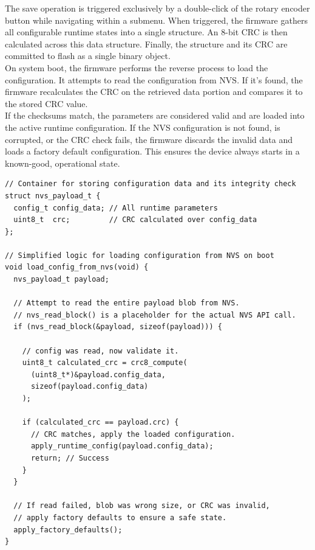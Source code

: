 The save operation is triggered exclusively by a double-click of the rotary encoder button while navigating within a submenu.
When triggered, the firmware gathers all configurable runtime states into a single structure.
An 8-bit \ac{CRC} is then calculated across this data structure.
Finally, the structure and its \ac{CRC} are committed to flash as a single binary object. \\

On system boot, the firmware performs the reverse process to load the configuration.
It attempts to read the configuration from \ac{NVS}.
If it's found, the firmware recalculates the \ac{CRC} on the retrieved data portion and compares it to the stored \ac{CRC} value. \\

If the checksums match, the parameters are considered valid and are loaded into the active runtime configuration.
If the \ac{NVS} configuration is not found, is corrupted, or the \ac{CRC} check fails, the firmware discards the invalid data and loads a factory default configuration.
This ensures the device always starts in a known-good, operational state.

\begin{longlisting}
\begin{verbatim}
// Container for storing configuration data and its integrity check
struct nvs_payload_t {
  config_t config_data; // All runtime parameters
  uint8_t  crc;         // CRC calculated over config_data
};

// Simplified logic for loading configuration from NVS on boot
void load_config_from_nvs(void) {
  nvs_payload_t payload;

  // Attempt to read the entire payload blob from NVS.
  // nvs_read_block() is a placeholder for the actual NVS API call.
  if (nvs_read_block(&payload, sizeof(payload))) {

    // config was read, now validate it.
    uint8_t calculated_crc = crc8_compute(
      (uint8_t*)&payload.config_data,
      sizeof(payload.config_data)
    );

    if (calculated_crc == payload.crc) {
      // CRC matches, apply the loaded configuration.
      apply_runtime_config(payload.config_data);
      return; // Success
    }
  }

  // If read failed, blob was wrong size, or CRC was invalid,
  // apply factory defaults to ensure a safe state.
  apply_factory_defaults();
}
\end{verbatim}
\caption{Simplified logic for reading and validating parameters from \ac{NVS} on boot.}
\label{lst:nvs_read_logic}
\end{longlisting}

